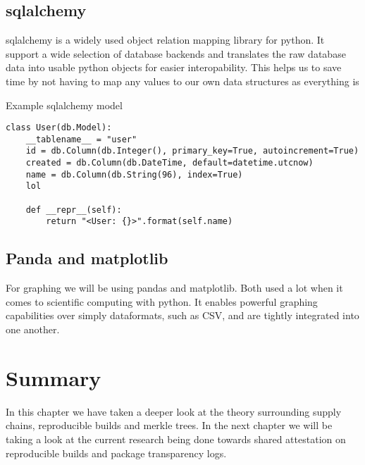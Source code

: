 \documentclass[../Main/thesis.tex]{subfiles}
\begin{document}
\subsection*{sqlalchemy}
sqlalchemy is a widely used object relation mapping library for python. It
support a wide selection of database backends and translates the raw database
data into usable python objects for easier interopability. This helps us to save
time by not having to map any values to our own data structures as everything is 

\begin{listing}[ht]
\caption{Example sqlalchemy model}
\label{lst:sqlalchemy}
\begin{verbatim}
class User(db.Model):
    __tablename__ = "user"
    id = db.Column(db.Integer(), primary_key=True, autoincrement=True)
    created = db.Column(db.DateTime, default=datetime.utcnow)
    name = db.Column(db.String(96), index=True)
    lol

    def __repr__(self):
        return "<User: {}>".format(self.name)
\end{verbatim}
\end{listing}


\subsection*{Panda and matplotlib}
For graphing we will be using pandas and matplotlib. Both used a lot when it
comes to scientific computing with python. It enables powerful graphing
capabilities over simply dataformats, such as CSV, and are tightly integrated
into one another.

\section*{Summary}\label{sec:summary-technologies} 
In this chapter we have taken a deeper look at the theory surrounding supply
chains, reproducible builds and merkle trees. In the next chapter we will be
taking a look at the current research being done towards shared attestation on
reproducible builds and package transparency logs.

\blankpage
\end{document}

